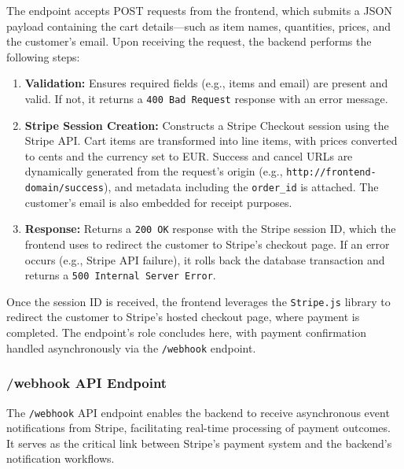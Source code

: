 The endpoint accepts POST requests from the frontend, which submits a JSON payload containing the cart details—such as item names, quantities, prices, and the customer's email. Upon receiving the request, the backend performs the following steps:
\begin{enumerate}
    \item \textbf{Validation:} Ensures required fields (e.g., items and email) are present and valid. If not, it returns a \texttt{400 Bad Request} response with an error message.
    \item \textbf{Stripe Session Creation:} Constructs a Stripe Checkout session using the Stripe API. Cart items are transformed into line items, with prices converted to cents and the currency set to EUR. Success and cancel URLs are dynamically generated from the request's origin (e.g., \texttt{http://frontend-domain/success}), and metadata including the \texttt{order\_id} is attached. The customer's email is also embedded for receipt purposes.
    \item \textbf{Response:} Returns a \texttt{200 OK} response with the Stripe session ID, which the frontend uses to redirect the customer to Stripe's checkout page. If an error occurs (e.g., Stripe API failure), it rolls back the database transaction and returns a \texttt{500 Internal Server Error}.
\end{enumerate}

Once the session ID is received, the frontend leverages the \texttt{Stripe.js} library to redirect the customer to Stripe's hosted checkout page, where payment is completed. The endpoint's role concludes here, with payment confirmation handled asynchronously via the \texttt{/webhook} endpoint.

\subsubsection{/webhook API Endpoint}

The \texttt{/webhook} API endpoint enables the backend to receive asynchronous event notifications from Stripe, facilitating real-time processing of payment outcomes. It serves as the critical link between Stripe’s payment system and the backend’s notification workflows.

